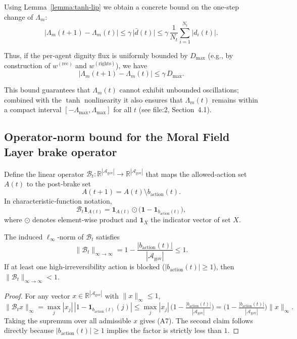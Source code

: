 \documentclass[11pt]{article}
\begin{document}
Using Lemma~\ref{lemma:tanh-lip} we obtain a concrete bound on the one‑step change of $\Lambda_m$:
\[
\big|\Lambda_m(t+1)-\Lambda_m(t)\big|
\le \gamma\,\big|\bar{d}(t)\big|
\le \gamma\,\frac{1}{N_t}\sum_{i=1}^{N_t}|d_i(t)|.
\tag{A5}
\]

Thus, if the per‑agent dignity flux is uniformly bounded by $D_{\max}$ (e.g., by construction of $w^{(\text{rec})}$ and $w^{(\text{rights})}$), we have
\[
\big|\Lambda_m(t+1)-\Lambda_m(t)\big|
\le \gamma\,D_{\max}.
\tag{A6}
\]

This bound guarantees that $\Lambda_m(t)$ cannot exhibit unbounded oscillations; combined with the $\tanh$ nonlinearity it also ensures that $\Lambda_m(t)$ remains within a compact interval $[-\Lambda_{\max},\Lambda_{\max}]$ for all $t$ (see file:2, Section~4.1).

\subsection{Operator‑norm bound for the Moral Field Layer brake operator}
Define the linear operator $\mathcal{B}_t:\mathbb{R}^{|\mathcal{A}_{\text{gov}}|}\to\mathbb{R}^{|\mathcal{A}_{\text{gov}}|}$ that maps the allowed‑action set $A(t)$ to the post‑brake set
\[
A(t+1)=A(t)\setminus b_{\text{action}}(t).
\]
In characteristic‑function notation,
\[
\mathcal{B}_t\mathbf{1}_{A(t)} = \mathbf{1}_{A(t)}\odot\big(\mathbf{1}-\mathbf{1}_{b_{\text{action}}(t)}\big),
\]
where $\odot$ denotes element‑wise product and $\mathbf{1}_{X}$ the indicator vector of set $X$.

\begin{lemma}
The induced $\ell_\infty$‑norm of $\mathcal{B}_t$ satisfies
\[
\|\mathcal{B}_t\|_{\infty\to\infty}=1-\frac{|b_{\text{action}}(t)|}{|\mathcal{A}_{\text{gov}}|}\le 1 .
\tag{A7}
\]
If at least one high‑irreversibility action is blocked ($|b_{\text{action}}(t)|\ge1$), then $\|\mathcal{B}_t\|_{\infty\to\infty}<1$.
\end{lemma}

\begin{proof}
For any vector $x\in\mathbb{R}^{|\mathcal{A}_{\text{gov}}|}$ with $\|x\|_\infty\le1$,
\[
\| \mathcal{B}_t x \|_\infty
= \max_j |x_j|\,|1-\mathbf{1}_{b_{\text{action}}(t)}(j)|
\le \max_j |x_j|\,\big(1-\tfrac{|b_{\text{action}}(t)|}{|\mathcal{A}_{\text{gov}}|}\big)
= \big(1-\tfrac{|b_{\text{action}}(t)|}{|\mathcal{A}_{\text{gov}}|}\big)\|x\|_\infty .
\]
Taking the supremum over all admissible $x$ gives (A7). The second claim follows directly because $|b_{\text{action}}(t)|\ge1$ implies the factor is strictly less than $1$.
\end{proof}
\end{document}

